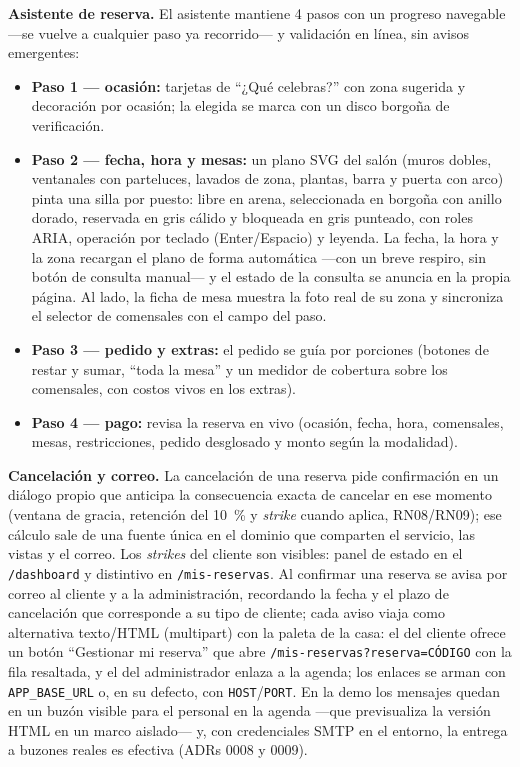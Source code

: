 \documentclass[12pt]{article}
\begin{document}
\noindent\textbf{Asistente de reserva.} El asistente mantiene 4 pasos con un progreso navegable ---se vuelve a cualquier paso ya recorrido--- y validaci{\'o}n en l{\'i}nea, sin avisos emergentes:
\begin{itemize}
  \item \textbf{Paso 1 --- ocasi{\'o}n:} tarjetas de ``¿Qu{\'e} celebras?'' con zona sugerida y decoraci{\'o}n por ocasi{\'o}n; la elegida se marca con un disco borgo{\~n}a de verificaci{\'o}n.
  \item \textbf{Paso 2 --- fecha, hora y mesas:} un plano SVG del sal{\'o}n (muros dobles, ventanales con parteluces, lavados de zona, plantas, barra y puerta con arco) pinta una silla por puesto: libre en arena, seleccionada en borgo{\~n}a con anillo dorado, reservada en gris c{\'a}lido y bloqueada en gris punteado, con roles ARIA, operaci{\'o}n por teclado (Enter/Espacio) y leyenda. La fecha, la hora y la zona recargan el plano de forma autom{\'a}tica ---con un breve respiro, sin bot{\'o}n de consulta manual--- y el estado de la consulta se anuncia en la propia p{\'a}gina. Al lado, la ficha de mesa muestra la foto real de su zona y sincroniza el selector de comensales con el campo del paso.
  \item \textbf{Paso 3 --- pedido y extras:} el pedido se gu{\'i}a por porciones (botones de restar y sumar, ``toda la mesa'' y un medidor de cobertura sobre los comensales, con costos vivos en los extras).
  \item \textbf{Paso 4 --- pago:} revisa la reserva en vivo (ocasi{\'o}n, fecha, hora, comensales, mesas, restricciones, pedido desglosado y monto seg{\'u}n la modalidad).
\end{itemize}

\noindent\textbf{Cancelaci{\'o}n y correo.} La cancelaci{\'o}n de una reserva pide confirmaci{\'o}n en un di{\'a}logo propio que anticipa la consecuencia exacta de cancelar en ese momento (ventana de gracia, retenci{\'o}n del 10~\% y \textit{strike} cuando aplica, RN08/RN09); ese c{\'a}lculo sale de una fuente {\'u}nica en el dominio que comparten el servicio, las vistas y el correo. Los \textit{strikes} del cliente son visibles: panel de estado en el \texttt{/dashboard} y distintivo en \texttt{/mis-reservas}. Al confirmar una reserva se avisa por correo al cliente y a la administraci{\'o}n, recordando la fecha y el plazo de cancelaci{\'o}n que corresponde a su tipo de cliente; cada aviso viaja como alternativa texto/HTML (multipart) con la paleta de la casa: el del cliente ofrece un bot{\'o}n ``Gestionar mi reserva'' que abre \texttt{/mis-reservas?reserva=C\'ODIGO} con la fila resaltada, y el del administrador enlaza a la agenda; los enlaces se arman con \texttt{APP\_BASE\_URL} o, en su defecto, con \texttt{HOST}/\texttt{PORT}. En la demo los mensajes quedan en un buz{\'o}n visible para el personal en la agenda ---que previsualiza la versi{\'o}n HTML en un marco aislado--- y, con credenciales SMTP en el entorno, la entrega a buzones reales es efectiva (ADRs 0008 y 0009).
\end{document}
